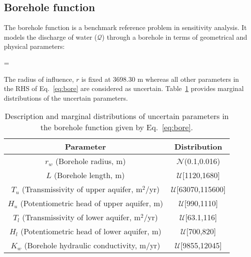 \subsection{Borehole function}

The borehole function is a benchmark reference problem in sensitivity analysis. It models the discharge
of water ($\mathcal{Q}$) through a borehole in terms of geometrical and physical parameters:

\be
{} = 
\label{eq:bore}
\ee

\noindent The radius of influence, $r$ is fixed at 3698.30 m whereas all other parameters
in the RHS of Eq.~\ref{eq:bore} are considered as uncertain. Table~\ref{tab:bore} provides
marginal distributions of the uncertain parameters. 

\begin{table}[htbp]
\renewcommand*{\arraystretch}{1.2}
\begin{center}
\begin{tabular}{|c|c|}
\hline
Parameter & Distribution \\ \hline \hline
$r_w$ (Borehole radius, m) & $\mathcal{N}$(0.1,0.016) \\
$L$ (Borehole length, m) & $\mathcal{U}$[1120,1680] \\
$T_u$ (Transmissivity of upper aquifer, m$^2$/yr) & $\mathcal{U}$[63070,115600] \\
$H_u$ (Potentiometric head of upper aquifer, m) & $\mathcal{U}$[990,1110] \\
$T_l$ (Transmissivity of lower aquifer, m$^2$/yr) & $\mathcal{U}$[63.1,116] \\
$H_l$ (Potentiometric head of lower aquifer, m) & $\mathcal{U}$[700,820] \\
$K_w$ (Borehole hydraulic conductivity, m/yr) & $\mathcal{U}$[9855,12045] \\
\hline
\end{tabular}
\end{center}

\caption{Description and marginal distributions of uncertain parameters in the borehole function
given by Eq.~\ref{eq:bore}.}
\label{tab:bore}
\end{table}

